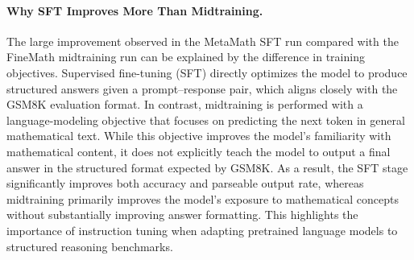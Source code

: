 \paragraph{Why SFT Improves More Than Midtraining.}

The large improvement observed in the MetaMath SFT run compared with the
FineMath midtraining run can be explained by the difference in training
objectives. Supervised fine-tuning (SFT) directly optimizes the model to
produce structured answers given a prompt–response pair, which aligns
closely with the GSM8K evaluation format. In contrast, midtraining is
performed with a language-modeling objective that focuses on predicting
the next token in general mathematical text. While this objective
improves the model's familiarity with mathematical content, it does not
explicitly teach the model to output a final answer in the structured
format expected by GSM8K. As a result, the SFT stage significantly
improves both accuracy and parseable output rate, whereas midtraining
primarily improves the model's exposure to mathematical concepts without
substantially improving answer formatting. This highlights the
importance of instruction tuning when adapting pretrained language
models to structured reasoning benchmarks.